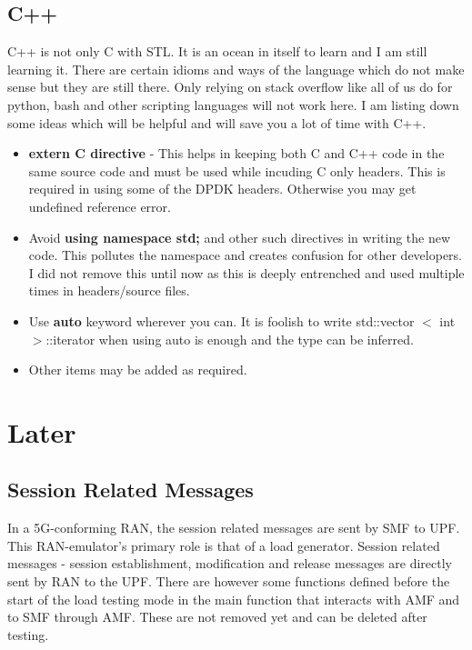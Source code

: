 \documentclass{article}
\begin{document}
\subsection{C++}
C++ is not only C with STL. It is an ocean in itself to learn and I am still learning it. There are certain idioms and ways of the language which do not make sense but they are still there. Only relying on stack overflow like all of us do for python, bash and other scripting languages will not work here. I am listing down some ideas which will be helpful and will save you a lot of time with C++. 
\begin{itemize}
    \item \textbf{extern C directive} - This helps in keeping both C and C++ code in the same source code and must be used while incuding C only headers. This is  required in using some of the DPDK headers. Otherwise you may get undefined reference error.
    \item Avoid \textbf{using namespace std;} and other such directives in writing the new code. This pollutes the namespace and creates confusion for other developers. I did not remove this until now as this is deeply entrenched and used multiple times in headers/source files. 
    \item Use \textbf{auto} keyword wherever you can. It is foolish to write std::vector $<$ int$>$::iterator when using auto is enough and the type can be inferred.
    \item Other items may be added as required.
\end{itemize}
\section{Later}
\subsection{Session Related Messages}
In a 5G-conforming RAN, the session related messages are sent by SMF to UPF.
This RAN-emulator's primary role is that of a load generator. Session related messages - session establishment, modification and release messages are directly sent by RAN to the UPF.
 There are however some functions defined before the start of the load testing mode in the main function that interacts with AMF and to SMF through AMF. These are not removed yet and can be deleted after testing.
 
\end{document}
